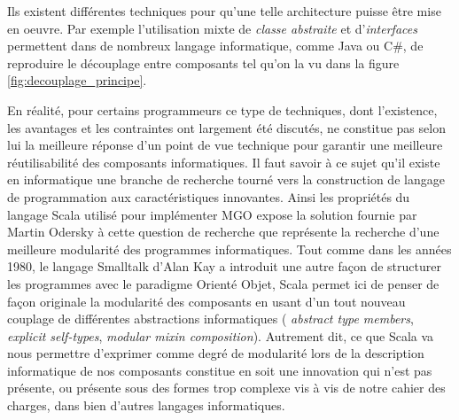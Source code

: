 Ils existent différentes techniques pour qu'une telle architecture puisse être mise en oeuvre. Par exemple l'utilisation mixte de \textit{classe abstraite} et d'\textit{interfaces} permettent dans de nombreux langage informatique, comme Java ou C\#, de reproduire le découplage entre composants tel qu'on la vu dans la figure \ref{fig:decouplage_principe}. 

En réalité, pour certains programmeurs \textcite{Odersky2005}  ce type de techniques, dont l'existence, les avantages et les contraintes ont largement été discutés, ne constitue pas selon lui la meilleure réponse d'un point de vue technique pour garantir une meilleure réutilisabilité des composants informatiques. Il faut savoir à ce sujet qu'il existe en informatique une branche de recherche tourné vers la construction de langage de programmation aux caractéristiques innovantes. Ainsi les propriétés du langage Scala utilisé pour implémenter MGO expose la solution fournie par Martin Odersky à cette question de recherche que représente la recherche d'une meilleure modularité des programmes informatiques. Tout comme dans les années 1980, le langage Smalltalk d'Alan Kay a introduit une autre façon de structurer les programmes avec le paradigme Orienté Objet, Scala permet ici de penser de façon originale la modularité des composants en usant d'un tout nouveau couplage de différentes abstractions informatiques ( \textit{abstract type members}, \textit{explicit self-types}, \textit{modular mixin composition}). Autrement dit, ce que Scala va nous permettre d'exprimer comme degré de modularité lors de la description informatique de nos composants constitue en soit une innovation qui n'est pas présente, ou présente sous des formes trop complexe vis à vis de notre cahier des charges, dans bien d'autres langages informatiques.



